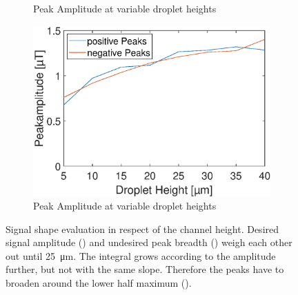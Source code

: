 \begin{figure}[h!]
\begin{subfigure}[r]{0.49\linewidth}
		\caption{Peak Amplitude at variable droplet heights}
		\label{fig:sim:h:int}
	\end{subfigure}
	\vfil
	\begin{subfigure}[c]{0.49\linewidth} 
		\centering
		\includegraphics[clip,trim={0mm 0mm 0mm 0mm}, width=\linewidth]{Ressourcen/Results/H/Ampl}
		\caption{Peak Amplitude at variable droplet heights}
		\label{fig:sim:h:ampl}
	\end{subfigure}
	\hfil
	\caption{Signal shape evaluation in respect of the channel height. Desired signal amplitude (\protect{}) and undesired peak breadth (\protect{}) weigh each other out until \SI{25}{\micro\meter}. The integral grows according to the amplitude further, but not with the same slope. Therefore the peaks have to broaden around the lower half maximum (\protect{}).}
	\label{fig:sim:h}
\end{figure}
\newpage

